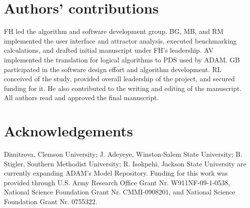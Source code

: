 \documentclass[10pt]{bmc_article}
\newenvironment{bmcformat}{\begin{raggedright}\baselineskip20pt\sloppy\setboolean{publ}{false}}{\end{raggedright}\baselineskip20pt\sloppy}
\begin{document}
\begin{bmcformat}
    

\section*{Authors' contributions}
FH led the algorithm and software development group. BG, MB, and RM implemented the user interface and attractor analysis, executed benchmarking calculations, and drafted initial manuscript under FH's leadership. AV implemented the translation for logical algorithms to PDS used by ADAM. GB participated in the software design effort and
algorithm development. RL  conceived of the study, provided overall leadership of the project, and secured
funding for it. He also contributed to the writing and editing of the manuscript. 
All authors read and approved the final manuscript.

\section*{Acknowledgements}
 Dimitrova, Clemson University; J. Adeyeye, Winston-Salem State University; B. Stigler, Southern Methodist University; R. Isokpehi, Jackson State University are currently expanding ADAM’s Model Repository.
Funding for this work was provided through U.S. Army Research Office Grant Nr. W911NF-09-1-0538,
National Science Foundation Grant Nr. CMMI-0908201, and National Science Foundation Grant Nr. 0755322.


 



\end{bmcformat}
\end{document}
